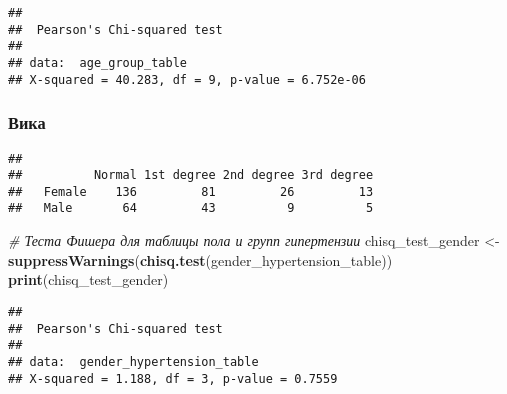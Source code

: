 \documentclass[
]{article}
\newenvironment{Shaded}{\begin{snugshade}}{\end{snugshade}}
\newcommand{\CommentTok}[1]{\textcolor[rgb]{0.56,0.35,0.01}{\textit{#1}}}
\newcommand{\FunctionTok}[1]{\textcolor[rgb]{0.13,0.29,0.53}{\textbf{#1}}}
\newcommand{\NormalTok}[1]{#1}
\newcommand{\OtherTok}[1]{\textcolor[rgb]{0.56,0.35,0.01}{#1}}
\newcommand{\SpecialCharTok}[1]{\textcolor[rgb]{0.81,0.36,0.00}{\textbf{#1}}}
\begin{document}
\begin{verbatim}
## 
##  Pearson's Chi-squared test
## 
## data:  age_group_table
## X-squared = 40.283, df = 9, p-value = 6.752e-06
\end{verbatim}

\subsubsection{Вика}\label{ux432ux438ux43aux430}

\begin{Shaded}
\end{Shaded}

\begin{verbatim}
##         
##          Normal 1st degree 2nd degree 3rd degree
##   Female    136         81         26         13
##   Male       64         43          9          5
\end{verbatim}

\begin{Shaded}
\begin{Highlighting}[]
\CommentTok{\# Теста Фишера для таблицы пола и групп гипертензии}
\NormalTok{chisq\_test\_gender }\OtherTok{\textless{}{-}} \FunctionTok{suppressWarnings}\NormalTok{(}\FunctionTok{chisq.test}\NormalTok{(gender\_hypertension\_table))}
\FunctionTok{print}\NormalTok{(chisq\_test\_gender)}
\end{Highlighting}
\end{Shaded}

\begin{verbatim}
## 
##  Pearson's Chi-squared test
## 
## data:  gender_hypertension_table
## X-squared = 1.188, df = 3, p-value = 0.7559
\end{verbatim}

\begin{Shaded}
\end{Shaded}
\end{document}
